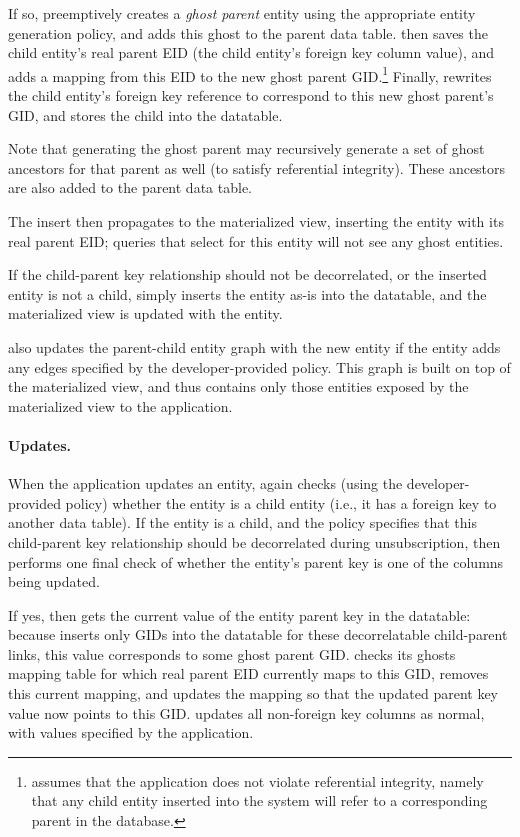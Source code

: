 If so, \name preemptively creates a \emph{ghost parent} entity using the appropriate entity
generation policy, and adds this ghost to the parent data table. \name then saves the child
entity's real parent EID (the child entity's foreign key column value), and adds a mapping from this
EID to the new ghost parent GID.\footnote{\name assumes that the application does not violate
referential integrity, namely that any child entity inserted into the system will refer to a
corresponding parent in the database.} Finally, \name rewrites the child entity's foreign key
reference to correspond to this new ghost parent's GID, and stores the child into the datatable.

Note that generating the ghost parent may recursively generate a set of ghost ancestors for that
parent as well (to satisfy referential integrity). These ancestors are also added to the parent data
table.

The insert then propagates to the materialized view, inserting the entity with its real parent EID; queries that
select for this entity will not see any ghost entities.

If the child-parent key relationship should not be decorrelated, or the inserted entity is not a
child, \name simply inserts the entity as-is into the datatable, and the materialized view is
updated with the entity.

\name also updates the parent-child entity graph with the new entity if the entity adds any edges
specified by the developer-provided policy. This graph is built on top of the materialized view, and
thus contains only those entities exposed by the materialized view to the application.

\paragraph{Updates.}
When the application updates an entity, \name again checks (using the developer-provided policy) whether
the entity is a child entity (i.e., it has a foreign key to another data table).
If the entity is a child, and the policy specifies that this child-parent key
relationship should be decorrelated during unsubscription, then \name performs one final check of
whether the entity's parent key is one of the columns being updated.

If yes, then \name gets the current value of the entity parent key in the datatable: because \name
inserts only GIDs into the datatable for these decorrelatable child-parent links, this value
corresponds to some ghost parent GID.
\name checks its ghosts mapping table for which real parent EID currently maps to this GID, removes
this current mapping, and updates the mapping so that the updated parent key value now points to
this GID.
\name updates all non-foreign key columns as normal, with values specified by the application.

